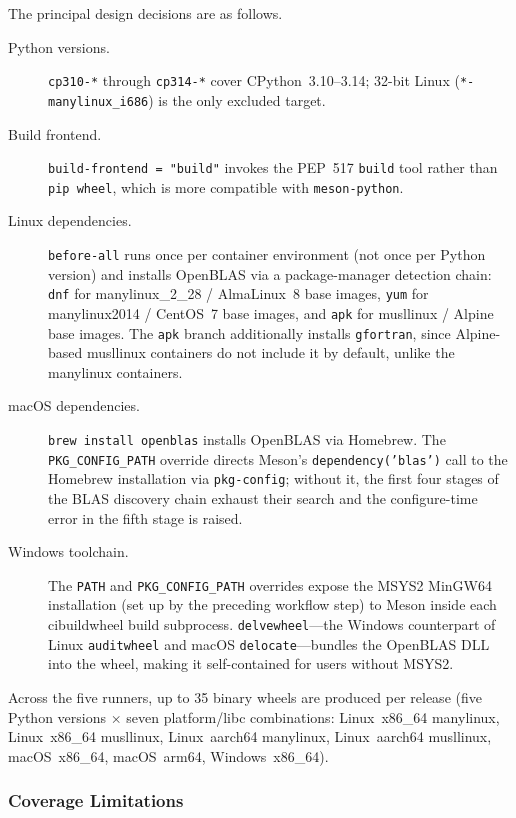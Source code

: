 \documentclass[12pt,a4paper]{article}
\begin{document}
The principal design decisions are as follows.

\begin{description}
  \item[Python versions.] \texttt{cp310-*} through \texttt{cp314-*} cover CPython~3.10--3.14; 32-bit Linux (\texttt{*-manylinux\_i686}) is the only excluded target.

  \item[Build frontend.] \texttt{build-frontend~=~"build"} invokes the PEP~517 \texttt{build} tool rather than \texttt{pip~wheel}, which is more compatible with \texttt{meson-python}.

  \item[Linux dependencies.] \texttt{before-all} runs once per container environment (not once per Python version) and installs OpenBLAS via a package-manager detection chain: \texttt{dnf} for manylinux\_2\_28 / AlmaLinux~8 base images, \texttt{yum} for manylinux2014 / CentOS~7 base images, and \texttt{apk} for musllinux / Alpine base images. The \texttt{apk} branch additionally installs \texttt{gfortran}, since Alpine-based musllinux containers do not include it by default, unlike the manylinux containers.

  \item[macOS dependencies.] \texttt{brew install openblas} installs OpenBLAS via Homebrew. The \texttt{PKG\_CONFIG\_PATH} override directs Meson's \texttt{dependency('blas')} call to the Homebrew installation via \texttt{pkg-config}; without it, the first four stages of the BLAS discovery chain exhaust their search and the configure-time error in the fifth stage is raised.

  \item[Windows toolchain.] The \texttt{PATH} and \texttt{PKG\_CONFIG\_PATH} overrides expose the MSYS2 MinGW64 installation (set up by the preceding workflow step) to Meson inside each cibuildwheel build subprocess. \texttt{delvewheel}---the Windows counterpart of Linux \texttt{auditwheel} and macOS \texttt{delocate}---bundles the OpenBLAS DLL into the wheel, making it self-contained for users without MSYS2.
\end{description}

Across the five runners, up to 35 binary wheels are produced per release (five Python versions $\times$ seven platform/libc combinations: Linux~x86\_64 manylinux, Linux~x86\_64 musllinux, Linux~aarch64 manylinux, Linux~aarch64 musllinux, macOS~x86\_64, macOS~arm64, Windows~x86\_64).

\subsubsection{Coverage Limitations}
\end{document}
